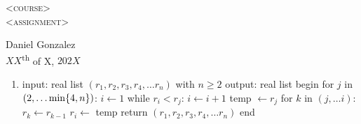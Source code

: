 \documentclass[12pt, a4paper]{article}
\renewcommand{\geq}{\geqslant}
\DeclarePairedDelimiter \set{\lbrace}{\rbrace}
\begin{document}
\begin{center}
    \textsc{\huge <course>}\\
    \textsc{\large <assignment>}\\
\end{center}
\begin{flushright}
    Daniel Gonzalez\\
    $XX$\textsuperscript{th} of X, $202X$
\end{flushright}

\begin{enumerate}
    \item
        \begin{algorithm}[caption={First Four Insertion Sort}, label={alg4}]
            input:  real list $(r_1, r_2, r_3, r_4, \dots r_n)$ with $n \geq 2$
            output: real list
            begin
                for $j$ in $(2, \dots \min\set*{4, n})$:
                    $i \gets 1$
                    while $r_i < r_j$:
                        $i \gets i + 1$
                    temp $\gets r_j$
                    for $k$ in $(j, \dots i)$:
                        $r_k \gets r_{k - 1}$
                    $r_i \gets$ temp
                return $(r_1, r_2, r_3, r_4, \dots r_n)$
            end
        \end{algorithm}
\end{enumerate}
\end{document}
